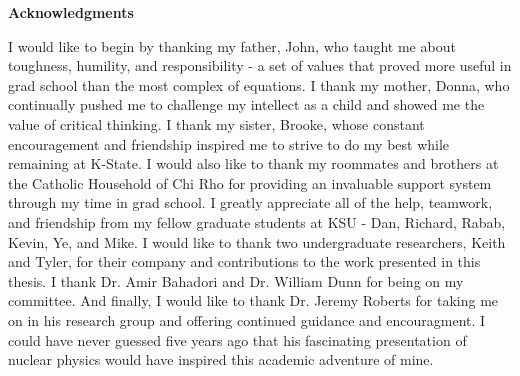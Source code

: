 
\newpage
\vspace*{0.9cm}
\begin{center}
{\bf \Huge Acknowledgments}
\end{center}

\setlength{\baselineskip}{0.8cm}



I would like to begin by thanking my father, John, who taught me about toughness, humility, and responsibility - a set of values that proved more useful in grad school than the most complex of equations.
I thank my mother, Donna, who continually pushed me to challenge my intellect as a child and showed me the value of critical thinking.
I thank my sister, Brooke, whose constant encouragement and friendship inspired me to strive to do my best while remaining at K-State.
I would also like to thank my roommates and brothers at the Catholic Household of Chi Rho for providing an invaluable support system through my time in grad school.
I greatly appreciate all of the help, teamwork, and friendship from my fellow graduate students at KSU - Dan, Richard, Rabab, Kevin, Ye, and Mike.
I would like to thank two undergraduate researchers, Keith and Tyler, for their company and contributions to the work presented in this thesis.
I thank Dr. Amir Bahadori and Dr. William Dunn for being on my committee.
And finally, I would like to thank Dr. Jeremy Roberts for taking me on in his research group and offering continued guidance and encouragment.
I could have never guessed five years ago that his fascinating presentation of nuclear physics would have inspired this academic adventure of mine.

